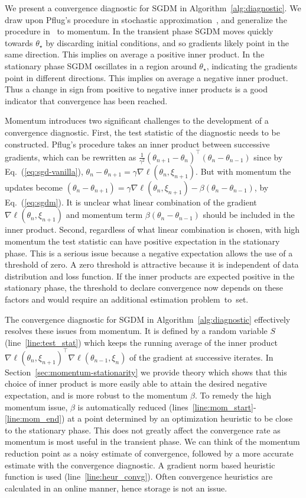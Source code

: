 \documentclass[conference]{IEEEtran}
\begin{document}
We present a convergence diagnostic for SGDM in Algorithm~\ref{alg:diagnostic}.
We draw upon Pflug's procedure in stochastic approximation~\cite{Article:Pflug_1990}, and generalize the procedure in~\cite{Proc:Chee_AISTATS18} to momentum. In the transient phase SGDM
moves quickly towards $\theta_\star$ by discarding initial conditions, and so gradients likely point in the same direction.
This implies on average a positive inner product.
In the stationary phase SGDM oscillates in a region around $\theta_\star$, indicating the gradients point in different directions.
This implies on average a negative inner product.
Thus a change in sign from positive to negative inner products is a good indicator that convergence has been reached.

Momentum introduces two significant challenges to the development of a convergence diagnostic.
First, the test statistic of the diagnostic needs to be constructed.
Pflug's procedure takes an inner product between successive gradients, which can be rewritten as $\frac{1}{\gamma^2} (\theta_{n+1} - \theta_n)^\top(\theta_n - \theta_{n-1})$ since by Eq.~(\ref{eq:sgd-vanilla}), $\theta_{n} - \theta_{n+1} = \gamma \nabla \ell (\theta_{n}, \xi_{n+1})$.
But with momentum the updates become $(\theta_n - \theta_{n+1}) = \gamma \nabla \ell(\theta_{n}, \xi_{n+1}) - \beta(\theta_n - \theta_{n-1})$, by Eq.~(\ref{eq:sgdm}).
It is unclear what linear combination of the gradient $\nabla \ell(\theta_n, \xi_{n+1})$ and momentum term $\beta(\theta_n - \theta_{n-1})$ should be included in the inner product. Second, regardless of what linear combination is chosen, with high momentum the test statistic can have positive expectation in the stationary phase.
This is a serious issue because a negative expectation allows the use of a threshold of zero.
A zero threshold is attractive because it is  independent of data distribution and loss function. If the inner products are expected positive in the stationary phase, the threshold to declare convergence now depends on these factors and would require an additional estimation problem~to~set.

The convergence diagnostic for SGDM in Algorithm~\ref{alg:diagnostic} effectively resolves these issues from momentum. It is defined by a random variable $S$ (line~\ref{line:test_stat}) which keeps the running average of the inner product $\nabla \ell (\theta_n, \xi_{n+1})^\top \nabla \ell (\theta_{n-1}, \xi_n)$ of the gradient at successive iterates.  In Section~\ref{sec:momentum-stationarity} we provide theory which shows that this choice of inner product is more easily able to attain the desired negative expectation, and is more robust to the momentum $\beta$. To remedy the high momentum issue, $\beta$ is automatically reduced (lines~\ref{line:mom_start}-\ref{line:mom_end}) at a point determined by an optimization heuristic to be close to the stationary phase. This does not greatly affect the convergence rate as momentum is most useful in the transient phase. We can think of the momentum reduction point as a noisy estimate of convergence, followed by a more accurate estimate with the convergence diagnostic. 
A gradient norm based heuristic function is used (line~\ref{line:heur_convg}).
Often convergence heuristics are calculated in an online manner, hence storage is not an issue.
\end{document}
